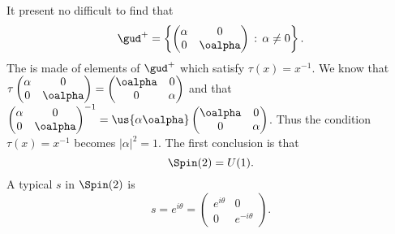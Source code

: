 It present no difficult to find that
\begin{equation}
	\gud^+=\left\{\begin{pmatrix}
		\alpha & 0       \\
		0      & \oalpha
	\end{pmatrix}\,:\,\alpha\neq 0\right\}.
\end{equation}
The  is made of elements of $\gud^+$ which satisfy $\tau(x)=x^{-1}$. We know that
$\tau\begin{pmatrix}
		\alpha & 0       \\
		0      & \oalpha
	\end{pmatrix} =\begin{pmatrix}
		\oalpha & 0      \\
		0       & \alpha
	\end{pmatrix}$ and that $\begin{pmatrix}
		\alpha & 0       \\
		0      & \oalpha
	\end{pmatrix}^{-1} =\us{\displaystyle\alpha\oalpha}\begin{pmatrix}
		\oalpha & 0      \\
		0       & \alpha
	\end{pmatrix}$. Thus the condition \hbox{$\tau(x)=x^{-1}$} becomes $|\alpha|^2=1$. The first conclusion is that
\begin{equation}
	\Spin(2)=U(1).
\end{equation}
A typical $s$ in $\Spin(2)$ is
\[s=e^{i\theta}=\begin{pmatrix}
		e^{i\theta} & 0            \\
		0           & e^{-i\theta}
	\end{pmatrix}.\]

